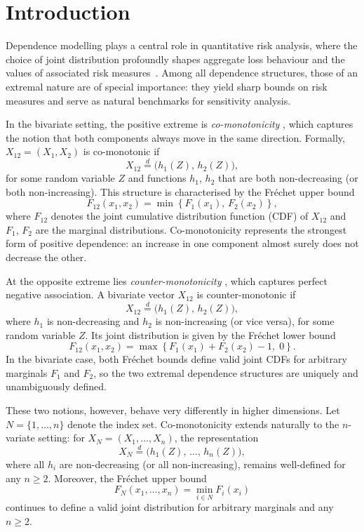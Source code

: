 \documentclass[letterpaper,12pt]{article}
\numberwithin{equation}{section}
\newcommand{\N}{{N}}
\begin{document}
\newpage
{\color{black}
\section{Introduction}
\label{sec:intro}

Dependence modelling plays a central role in quantitative risk analysis, where the choice of joint distribution
profoundly shapes aggregate loss behaviour and the values of associated risk
measures~\citep{Lauzier2023, Deelstra2011, Dhaene2002a, Cheung2014a}. Among
all dependence structures, those of an extremal nature are of special importance:
they yield sharp bounds on risk measures and serve as natural benchmarks for
sensitivity analysis.

In the bivariate setting, the positive extreme is \emph{co-monotonicity}
\citep{Dhaene2002, Nelson2010}, which captures the notion that both components
always move in the same direction. Formally, $X_{12}=(X_1, X_2)$ is co-monotonic
if
\[
    X_{12} \stackrel{d}{=} \bigl(h_1(Z),\, h_2(Z)\bigr),
\]
for some random variable $Z$ and functions $h_1$, $h_2$ that are both
non-decreasing (or both non-increasing). This structure is characterised by the
Fr\'{e}chet upper bound
\[
    F_{12}(x_1, x_2) = \min\left\{F_1(x_1),\, F_2(x_2)\right\},
\]
where $F_{12}$ denotes the joint cumulative distribution function (CDF) of
$X_{12}$ and $F_1$, $F_2$ are the marginal distributions. Co-monotonicity
represents the strongest form of positive dependence: an increase in one
component almost surely does not decrease the other.

At the opposite extreme lies \emph{counter-monotonicity} \citep{Dhaene1999,
Nelson2010}, which captures perfect negative association. A bivariate vector
$X_{12}$ is counter-monotonic if
\[
    X_{12} \stackrel{d}{=} \bigl(h_1(Z),\, h_2(Z)\bigr),
\]
where $h_1$ is non-decreasing and $h_2$ is non-increasing (or vice versa), for
some random variable $Z$. Its joint distribution is given by the Fr\'{e}chet
lower bound
\[
    F_{12}(x_1, x_2) = \max\left\{F_1(x_1) + F_2(x_2) - 1,\; 0\right\}.
\]
In the bivariate case, both Fr\'{e}chet bounds define valid joint CDFs for
arbitrary marginals $F_1$ and $F_2$, so the two extremal dependence structures
are uniquely and unambiguously defined.

These two notions, however, behave very differently in higher dimensions. Let
$\N = \{1,\dots, n\}$ denote the index set. Co-monotonicity extends naturally to
the $n$-variate setting: for $X_{\N}= (X_1, \dots, X_n)$, the representation
\[
    X_{\N}\stackrel{d}{=} \bigl(h_1(Z),\, \dots,\, h_n(Z)\bigr),
\]
where all $h_i$ are non-decreasing (or all non-increasing), remains well-defined
for any $n \ge 2$. Moreover, the Fr\'{e}chet upper bound
\[
    F_{\N}(x_1, \dots, x_n) = \min_{i\in\N} F_i(x_i)
\]
continues to define a valid joint distribution for arbitrary marginals and any
$n \ge 2$.

}
\end{document}
